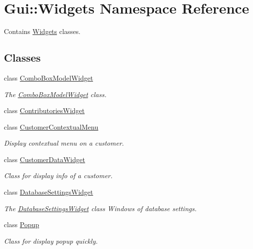 \hypertarget{namespaceGui_1_1Widgets}{\section{Gui\-:\-:Widgets Namespace Reference}
\label{namespaceGui_1_1Widgets}
}


Contains \hyperlink{namespaceGui_1_1Widgets}{Widgets} classes.  


\subsection*{Classes}
\begin{DoxyCompactItemize}
\item 
class \hyperlink{classGui_1_1Widgets_1_1ComboBoxModelWidget}{Combo\-Box\-Model\-Widget}
\begin{DoxyCompactList}\small\item\em The \hyperlink{classGui_1_1Widgets_1_1ComboBoxModelWidget}{Combo\-Box\-Model\-Widget} class. \end{DoxyCompactList}\item 
class \hyperlink{classGui_1_1Widgets_1_1ContributoriesWidget}{Contributories\-Widget}
\item 
class \hyperlink{classGui_1_1Widgets_1_1CustomerContextualMenu}{Customer\-Contextual\-Menu}
\begin{DoxyCompactList}\small\item\em Display contextual menu on a customer. \end{DoxyCompactList}\item 
class \hyperlink{classGui_1_1Widgets_1_1CustomerDataWidget}{Customer\-Data\-Widget}
\begin{DoxyCompactList}\small\item\em Class for display info of a customer. \end{DoxyCompactList}\item 
class \hyperlink{classGui_1_1Widgets_1_1DatabaseSettingsWidget}{Database\-Settings\-Widget}
\begin{DoxyCompactList}\small\item\em The \hyperlink{classGui_1_1Widgets_1_1DatabaseSettingsWidget}{Database\-Settings\-Widget} class Windows of database settings. \end{DoxyCompactList}\item 
class \hyperlink{classGui_1_1Widgets_1_1Popup}{Popup}
\begin{DoxyCompactList}\small\item\em Class for display popup quickly. \end{DoxyCompactList}\item 

\end{DoxyCompactItemize}

